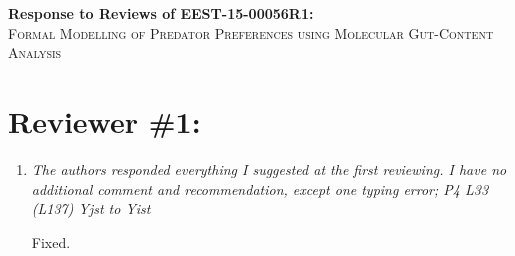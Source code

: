 \documentclass[12pt]{article}
\begin{document}
\begin{center}
  \begin{Large}
    \textbf{Response to Reviews of EEST-15-00056R1:}\\
    \textsc{Formal Modelling of Predator Preferences using Molecular Gut-Content
      Analysis}
  \end{Large}
\end{center}




\section{Reviewer \#1:}
\begin{enumerate}
\item  \textit{The authors responded everything I suggested at the first reviewing. I have no additional comment and recommendation, except one typing error; P4 L33 (L137) Yjst to Yist}

Fixed.



\end{enumerate}
\end{document}
